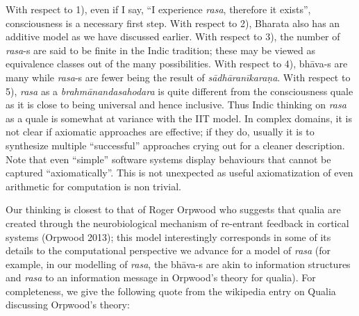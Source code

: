 With respect to 1), even if I say, “I experience \textsl{rasa}, therefore it exists”, consciousness is a necessary first step. With respect to 2), Bharata also has an additive model as we have discussed earlier. With respect to 3), the number of \textsl{rasa}-s are said to be finite in the Indic tradition; these may be viewed as equivalence classes out of the many possibilities. With respect to 4), bhāva-s are many while \textsl{rasa}-s are fewer being the result of \textsl{sādhāranīkaraṇa}. With respect to 5), \textsl{rasa} as a \textsl{brahmānandasahodara} is quite different from the consciousness quale as it is close to being universal and hence inclusive. Thus Indic thinking on \textsl{rasa} as a quale is somewhat at variance with the IIT model. In complex domains, it is not clear if axiomatic approaches are effective; if they do, usually it is to synthesize multiple “successful” approaches crying out for a cleaner description. Note that even “simple” software systems display behaviours that cannot be captured “axiomatically”. This is not unexpected as useful axiomatization of even arithmetic for computation is non trivial.

Our thinking is closest to that of Roger Orpwood who suggests that qualia are created through the neurobiological mechanism of re-entrant feedback in cortical systems (Orpwood 2013); this model interestingly corresponds in some of its details to the computational perspective we advance for a model of \textsl{rasa} (for example, in our modelling of \textsl{rasa}, the bhāva-s are akin to information structures and \textsl{rasa} to an information message in Orpwood’s theory for qualia). For completeness, we give the following quote from the wikipedia entry on Qualia discussing Orpwood’s theory:

